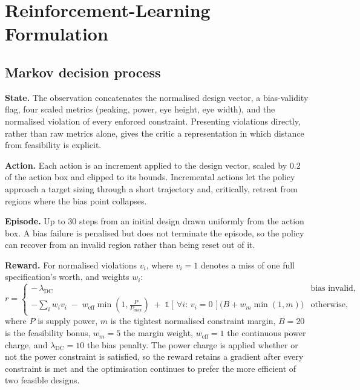 \documentclass[10pt,a4paper]{article}
\begin{document}
\section{Reinforcement-Learning Formulation}
\label{sec:rl}

\subsection{Markov decision process}

\textbf{State.} The observation concatenates the normalised design vector, a
bias-validity flag, four scaled metrics (peaking, power, eye height, eye width),
and the normalised violation of every enforced constraint. Presenting violations
directly, rather than raw metrics alone, gives the critic a representation in
which distance from feasibility is explicit.

\textbf{Action.} Each action is an increment applied to the design vector, scaled
by $0.2$ of the action box and clipped to its bounds. Incremental actions let the
policy approach a target sizing through a short trajectory and, critically,
retreat from regions where the bias point collapses.

\textbf{Episode.} Up to 30 steps from an initial design drawn uniformly from the
action box. A bias failure is penalised but does not terminate the episode, so
the policy can recover from an invalid region rather than being reset out of it.

\textbf{Reward.} For normalised violations $v_i$, where $v_i=1$ denotes a miss of
one full specification's worth, and weights $w_i$:
\begin{equation}
r =
\begin{cases}
-\,\lambda_\mathrm{DC} & \text{bias invalid},\\[4pt]
\displaystyle -\sum_i w_i v_i \;-\; w_\mathrm{eff}\min\!\left(1,\frac{P}{P_\mathrm{max}}\right)
\;+\; \mathbb{1}[\,\forall i:\,v_i = 0\,]\Big(B + w_m \min(1, m)\Big) & \text{otherwise},
\end{cases}
\label{eq:reward}
\end{equation}
where $P$ is supply power, $m$ is the tightest normalised constraint margin,
$B=20$ is the feasibility bonus, $w_m=5$ the margin weight, $w_\mathrm{eff}=1$
the continuous power charge, and $\lambda_\mathrm{DC}=10$ the bias penalty. The
power charge is applied whether or not the power constraint is satisfied, so the
reward retains a gradient after every constraint is met and the optimisation
continues to prefer the more efficient of two feasible designs.
\end{document}
